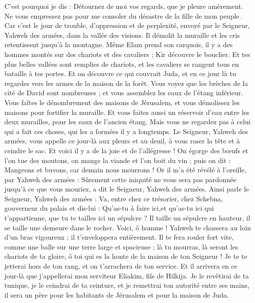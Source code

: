 \begin{multicols}{2}
C'est pourquoi je dis : Détournez de moi vos regards, que je pleure amèrement. Ne vous empressez pas pour me consoler du désastre de la fille de mon peuple.
Car c'est le jour de trouble, d'oppression et de perplexité, envoyé par le Seigneur, Yahweh des armées, dans la vallée des visions. Il démolit la muraille et les cris retentissent jusqu'à la montagne.
Même Elam prend son carquois, il y a des hommes montés sur des chariots et des cavaliers ; Kir découvre le bouclier.
Et tes plus belles vallées sont remplies de chariots, et les cavaliers se rangent tous en bataille à tes portes.
Et on découvre ce qui couvrait Juda, et en ce jour là tu regardes vers les armes de la maison de la forêt.
Vous voyez que les brèches de la cité de David sont nombreuses ; et vous assemblez les eaux de l'étang inférieur.
Vous faîtes le dénombrement des maisons de Jérusalem, et vous démolissez les maisons pour fortifier la muraille.
Et vous faites aussi un réservoir d'eau entre les deux murailles, pour les eaux de l'ancien étang. Mais vous ne regardez pas à celui qui a fait ces choses, qui les a formées il y a longtemps.
Le Seigneur, Yahweh des armées, vous appelle ce jour-là aux pleurs et au deuil, à vous raser la tête et à ceindre le sac.
Et voici il y a de la joie et de l'allégresse ! On égorge des bœufs et l'on tue des moutons, on mange la viande et l'on boit du vin ; puis on dit : Mangeons et buvons, car demain nous mourrons !
Or il m'a été révélé à l'oreille, par Yahweh des armées : Sûrement cette iniquité ne vous sera pas pardonnée jusqu'à ce que vous mouriez, a dit le Seigneur, Yahweh des armées.
Ainsi parle le Seigneur, Yahweh des armées : Va, entre chez ce trésorier, chez Schebna, gouverneur du palais et dis-lui :
Qu'as-tu à faire ici,et qu'as-tu ici qui t'appartienne, que tu te tailles ici un sépulcre ? Il taille un sépulcre en hauteur, il se taille une demeure dans le rocher.
Voici, ô homme ! Yahweh te chassera au loin d'un bras vigoureux ; il t'enveloppera entièrement.
Il te fera rouler fort vite, comme une balle sur une terre large et spacieuse ; là tu mourras, là seront les chariots de ta gloire, ô toi qui es la honte de la maison de ton Seigneur !
Je te te jetterai hors de ton rang, et on t'arrachera de ton service.
Et il arrivera en ce jour-là que j'appellerai mon serviteur Eliakim, fils de Hilkija.
Je le revêtirai de ta tunique, je le ceindrai de ta ceinture, et je remettrai ton autorité entre ses mains, il sera un père pour les habitants de Jérusalem et pour la maison de Juda.

\end{multicols}

